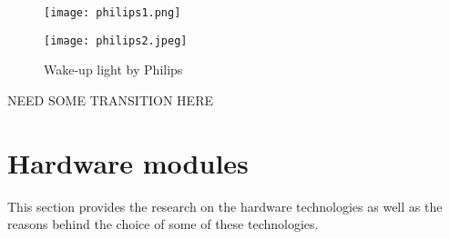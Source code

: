 \begin{figure}[h!]
\centering
\begin{minipage}[b]{0.45\textwidth}
\texttt{[image: philips1.png]}
\label{fig:philips1}
\end{minipage}
\begin{minipage}[b]{0.45\textwidth}
\texttt{[image: philips2.jpeg]}
\label{fig:philips2}
\end{minipage}
\caption{Wake-up light by Philips}
\label{philips}
\end{figure}

\vfill
NEED SOME TRANSITION HERE 

\section{Hardware modules}
This section provides the research on the hardware technologies as well as the reasons behind the choice of some of these technologies. 

